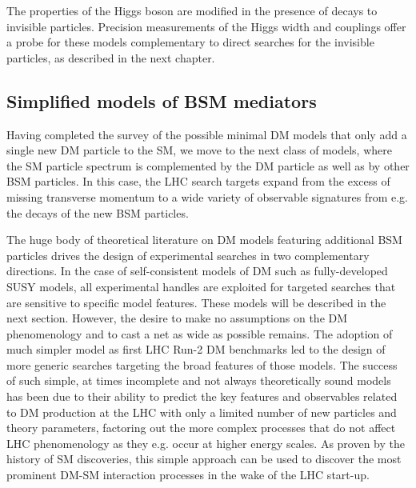 
The properties of the Higgs boson are modified in the presence of decays to invisible particles. Precision measurements of the Higgs width and couplings offer a probe for these models complementary to direct searches for the invisible particles, as described in the next chapter. 



\subsection{Simplified models of BSM mediators}
\label{sec:BSMMediatorModels}

Having completed the survey of the possible minimal DM models that only add a single new DM particle to the SM, we move to the next class of models, where the SM particle spectrum is complemented by the DM particle as well as by other BSM particles. In this case, the LHC search targets expand from the excess of missing transverse momentum to a wide variety of observable signatures from e.g. the decays of the new BSM particles. 

The huge body of theoretical literature on DM models featuring additional BSM particles drives the design of experimental searches in two complementary directions. In the case of self-consistent models of DM such as fully-developed SUSY models, all experimental handles are exploited for targeted searches that are sensitive to specific model features. These models will be described in the next section. However, the desire to make no assumptions on the DM phenomenology and to cast a net as wide as possible remains. The adoption of much simpler model as first LHC Run-2 DM benchmarks led to the design of more generic searches targeting the broad features of those models. The success of such simple, at times incomplete and not always theoretically sound models has been due to their ability to predict the key features and observables related to DM production at the LHC with only a limited number of new particles and theory parameters, factoring out the more complex processes that do not affect LHC phenomenology as they e.g. occur at higher energy scales. As proven by the history of SM discoveries, this simple approach can be used to discover the most prominent DM-SM interaction processes in the wake of the LHC start-up. 

